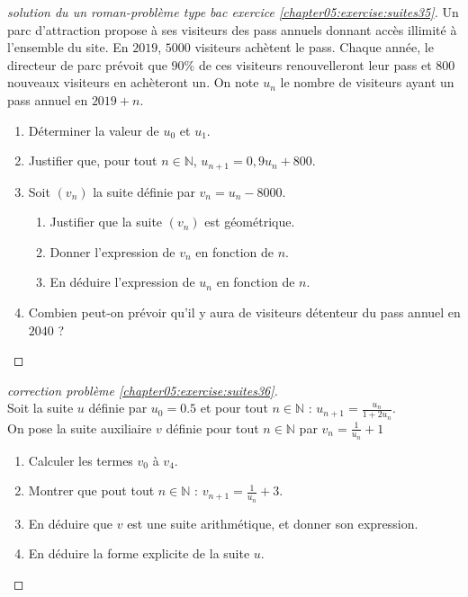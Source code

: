 \documentclass[main.tex]{subfiles}
\begin{document}
\begin{proof}[solution du un roman-problème type bac exercice \ref{chapter05:exercise:suites35}]
 
Un parc d'attraction propose à ses visiteurs des pass annuels donnant accès illimité à l'ensemble du site. En $2019$, $5000$ visiteurs achètent le pass. Chaque année, le directeur de parc prévoit que $90\%$ de ces visiteurs renouvelleront leur pass et $800$ nouveaux visiteurs en achèteront un. On note $u_n$ le nombre de visiteurs ayant un pass annuel en $2019+n$.
\begin{enumerate}[label=\arabic*),leftmargin=*] 
	\item Déterminer la valeur de $u_0$ et $u_1$.
	\item Justifier que, pour tout $n \in \mathbb{N}$, $u_{n+1}=0,9u_n+800$.
	\item Soit $(v_n)$ la suite définie par $v_n=u_n-8000$.
	\begin{enumerate}[label=\alph*),leftmargin=*] 
		\item Justifier que la suite $(v_n)$ est géométrique.
		\item Donner l'expression de $v_n$ en fonction de $n$.
		\item En déduire l'expression de $u_n$ en fonction de $n$.
	\end{enumerate}
	\item Combien peut-on prévoir qu'il y aura de visiteurs détenteur du pass annuel en $2040$ ?
\end{enumerate}
\end{proof}
\begin{proof}[correction problème \ref{chapter05:exercise:suites36}] \hfill \\
Soit la suite $u$ définie par $u_0=0.5$ et pour tout $n\in\mathbb{N}$ : $u_{n+1}=\frac{u_n}{1+2u_n}$.\\
On pose la suite auxiliaire $v$ définie pour tout $n\in\mathbb{N}$ par  $v_n=\frac{1}{u_n}+1$
\begin{enumerate}[label=\arabic*),leftmargin=*] 
	\item Calculer les termes $v_0$ à $v_4$.
	\item Montrer que pout tout $n\in\mathbb{N}$ : $v_{n+1}=\frac{1}{u_n}+3$.
	\item En déduire que $v$ est une suite arithmétique, et donner son expression.
	\item En déduire la forme explicite de la suite $u$.
\end{enumerate} 
\end{proof}
%
 
\end{document}
